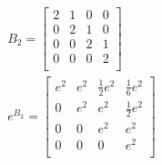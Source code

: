\begin{example}
    \begin{align*}
        B_2 = \begin{bmatrix}
            2 & 1 & 0 & 0 \\
            0 & 2 & 1 & 0 \\
            0 & 0 & 2 & 1 \\
            0 & 0 & 0 & 2 \\
        \end{bmatrix} \\
        e^{B_2} = \begin{bmatrix}
            e^{2} & e^{2} & \frac{1}{2} e^{2} & \frac{1}{6} e^{2} \\
            0     & e^{2} & e^{2}             & \frac{1}{2} e^{2} \\
            0     & 0     & e^{2}             & e^{2}             \\
            0     & 0     & 0                 & e^{2}             \\
        \end{bmatrix}
    \end{align*}
\end{example}